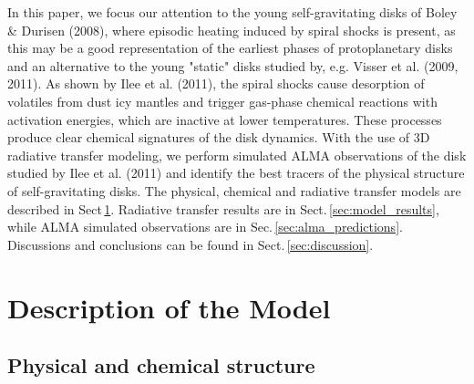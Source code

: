 \documentclass[useAMS,usenatbib]{mn2e}
\begin{document}
In this paper, we focus our attention to the young self-gravitating disks of Boley \& Durisen (2008), where episodic heating induced by spiral shocks is present, as this may be a good representation of the earliest phases of protoplanetary disks and an alternative to the young "static" disks studied by, e.g. Visser et al. (2009, 2011). As shown by Ilee et al. (2011), the spiral shocks cause desorption of volatiles from dust icy mantles and trigger gas-phase chemical reactions with activation energies, which are inactive at lower temperatures. These processes produce clear chemical signatures of the disk dynamics. With the use of 3D radiative transfer modeling, we perform simulated ALMA observations of the disk studied by Ilee et al. (2011) and identify the best tracers of the physical structure of self-gravitating disks. The physical, chemical and radiative transfer models are described in Sect\,\ref{sec:description_model}. Radiative transfer results are in Sect.\,\ref{sec:model_results}, while ALMA simulated observations are in Sec.\,\ref{sec:alma_predictions}. Discussions and conclusions can be found in Sect.\,\ref{sec:discussion}. 
  
  

\section{Description of the Model} \label{sec:description_model}

\subsection{Physical and chemical structure} \label{subsec:physical_structure}

\end{document}
